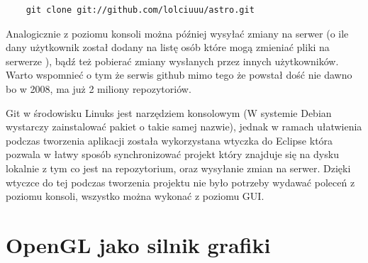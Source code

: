 \begin{verbatim}
	git clone git://github.com/lolciuuu/astro.git
\end{verbatim}

Analogicznie z poziomu konsoli można później wysyłać zmiany na serwer (o ile dany użytkownik został dodany na listę osób które mogą zmieniać pliki na serwerze ), bądź też pobierać zmiany wysłanych przez innych użytkowników. Warto wspomnieć o tym że serwis github mimo tego że powstał dość nie dawno bo w 2008, ma już 2 miliony repozytoriów. 

Git w środowisku Linuks jest narzędziem konsolowym (W systemie Debian wystarczy zainstalować pakiet o takie samej nazwie), jednak w ramach ułatwienia podczas tworzenia aplikacji została wykorzystana wtyczka do Eclipse która pozwala w łatwy sposób synchronizować projekt który znajduje się na dysku lokalnie z tym co jest na repozytorium, oraz wysyłanie zmian na serwer. Dzięki wtyczce do tej podczas tworzenia projektu nie było potrzeby wydawać poleceń z poziomu konsoli, wszystko można wykonać z poziomu GUI.


\section{OpenGL jako silnik grafiki}

